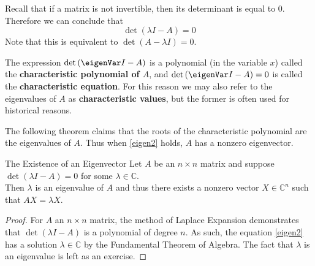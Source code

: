 Recall that if a matrix
is not invertible, then its determinant is equal to $0$.  Therefore we
can conclude that
\begin{equation}
\det \left( \lambda I - A\right) =0  \label{eigen2}
\end{equation}
Note that this is equivalent to $\det \left(A- \lambda I \right) =0$. 

The expression $\det \left( \eigenVar I-A\right) $ is a polynomial (in
the variable $x$) called the
\textbf{characteristic polynomial of $A$}, and 
$\det \left( \eigenVar I-A\right) =0$ is called the \textbf{characteristic
equation}.  For this reason we may also refer to
the eigenvalues of $A$ as \textbf{characteristic values}, but the
former is often used for historical reasons.

The following theorem claims that the roots of the characteristic
polynomial are the eigenvalues of $A$.  Thus when \ref{eigen2}
holds, $A$ has a nonzero eigenvector.

\begin{theorem}{The Existence of an Eigenvector}\label{thm:existenceofeigenvector}
Let $A$ be an $n\times n$ matrix and suppose $\det \left( \lambda I -
A\right) =0$ for some $ \lambda \in \mathbb{C}$.  \\
Then $\lambda$ is an eigenvalue of $A$ and thus there exists a nonzero
vector $X \in \mathbb{C}^{n}$ such that $AX=\lambda X$. 
\end{theorem}

\ifdefined\showproofs
\begin{proof}
For $A$ an $n\times n$ matrix, the method of Laplace
Expansion demonstrates that $\det \left( \lambda I - A \right) $ is a
polynomial of degree $n.$ As such, the equation
\ref{eigen2} has a solution $\lambda \in \mathbb{C}$ by the Fundamental
Theorem of Algebra. The fact that $\lambda$ is an eigenvalue is left as an exercise. 
\end{proof}
\fi